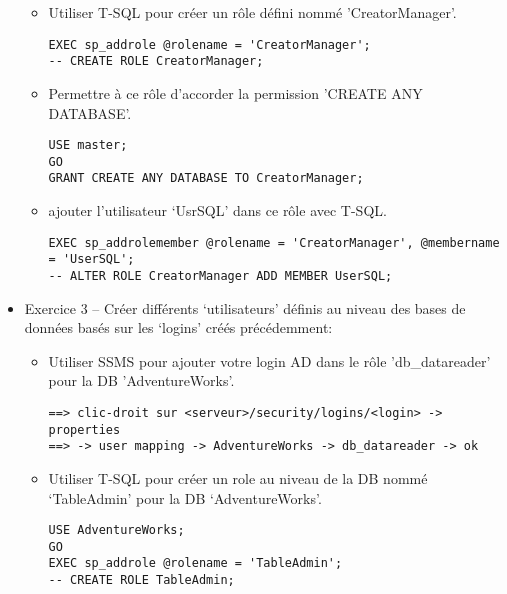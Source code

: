 \documentclass[a4paper]{article}
\begin{document}
\begin{itemize}
\begin{itemize}
\item Utiliser T-SQL pour créer un rôle défini nommé 'CreatorManager'.
\begin{example} \begin{verbatim}
EXEC sp_addrole @rolename = 'CreatorManager';
-- CREATE ROLE CreatorManager;
\end{verbatim} \end{example}

\item Permettre à ce rôle d’accorder la permission 'CREATE ANY DATABASE'.
\begin{example} \begin{verbatim}
USE master;
GO
GRANT CREATE ANY DATABASE TO CreatorManager;
\end{verbatim} \end{example}

\item ajouter l’utilisateur ‘UsrSQL’ dans ce rôle avec T-SQL.
\begin{example} \begin{verbatim}
EXEC sp_addrolemember @rolename = 'CreatorManager', @membername = 'UserSQL';
-- ALTER ROLE CreatorManager ADD MEMBER UserSQL;
\end{verbatim} \end{example}

\end{itemize}



\item Exercice 3 -- Créer différents ‘utilisateurs’ définis au niveau des bases de données basés sur les ‘logins’ créés précédemment:
\begin{itemize}

\item Utiliser SSMS pour ajouter votre login AD dans le rôle 'db\_datareader' pour la DB 'AdventureWorks'.
\begin{example} \begin{verbatim}
==> clic-droit sur <serveur>/security/logins/<login> -> properties
==> -> user mapping -> AdventureWorks -> db_datareader -> ok
\end{verbatim} \end{example}

\item Utiliser T-SQL pour créer un role au niveau de la DB nommé ‘TableAdmin’ pour la DB ‘AdventureWorks’.
\begin{example} \begin{verbatim}
USE AdventureWorks;
GO
EXEC sp_addrole @rolename = 'TableAdmin';
-- CREATE ROLE TableAdmin;
\end{verbatim} \end{example}


\end{itemize}
\end{itemize}
\end{document}
